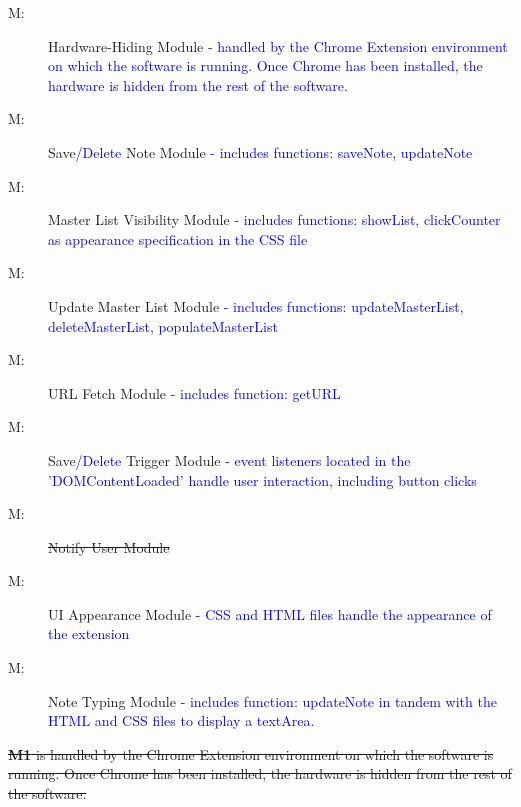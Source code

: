 \documentclass[12pt, titlepage]{article}
\newcounter{mnum}
\newcommand{\mthemnum}{M\themnum}
\begin{document}
\begin{description}
\item [ \mthemnum \label{mHH}:] Hardware-Hiding Module
\textcolor{blue}{ - handled by the Chrome Extension environment on which the 
	software is running. Once Chrome has been installed, the hardware is hidden 
	from the rest of the software.}
\item [ \mthemnum \label{mSave}:] Save\textcolor{blue}{/Delete}  
Note Module 
\textcolor{blue}{ - includes functions: saveNote, updateNote}
\item [ \mthemnum \label{mVisibility}:] Master List 
Visibility Module \textcolor{blue}{ - includes functions: showList, clickCounter as 
appearance specification in the CSS file}
\item [ \mthemnum \label{mUpdate}:] Update Master List 
Module \textcolor{blue}{ - includes functions: updateMasterList, deleteMasterList, 
populateMasterList}
\item [ \mthemnum \label{mURL}:] URL Fetch Module 
\textcolor{blue}{ - includes function: getURL}
\item [ \mthemnum \label{mTrigger}:] Save\textcolor{blue}{/Delete} 
Trigger Module 
\textcolor{blue}{ - event listeners located in the 'DOMContentLoaded' handle user 
interaction, including button clicks}

\item [ \mthemnum \label{mNotify}:] \sout{Notify User Module}

\item [ \mthemnum \label{mUI}:] UI Appearance Module 
\textcolor{blue}{ - CSS and HTML files handle the appearance of the extension}

\item [ \mthemnum \label{mNote}:] Note Typing Module 
\textcolor{blue}{ - includes function: updateNote in tandem with the HTML and CSS files 
to display a textArea.}
\end{description}

\sout{\textbf{M1} is handled by the Chrome Extension environment on which the 
	software is running. Once Chrome has been installed, the hardware is hidden 
	from the rest of the software.}\\
\end{document}
